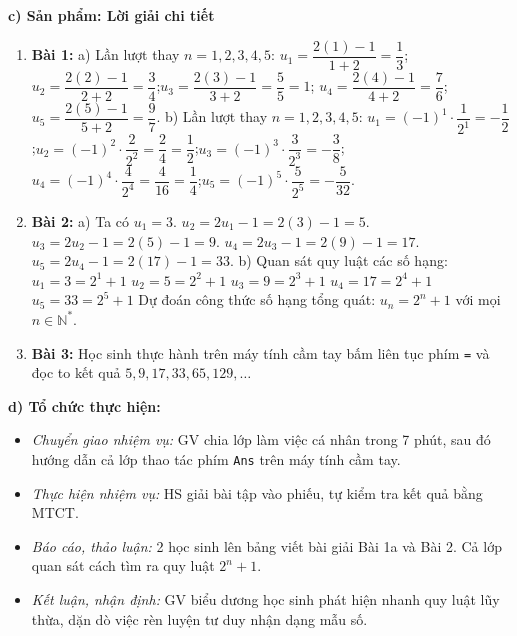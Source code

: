 \documentclass[12pt, a4paper]{article}
\begin{document}
\noindent \textbf{c) Sản phẩm: Lời giải chi tiết}  
\begin{enumerate}[leftmargin=0.6cm]  
    \item \textbf{Bài 1:}  
    a) Lần lượt thay $n = 1, 2, 3, 4, 5$:  
    $u_1 = \dfrac{2(1) - 1}{1 + 2} = \dfrac{1}{3}$;\quad $u_2 = \dfrac{2(2) - 1}{2 + 2} = \dfrac{3}{4}$;\quad $u_3 = \dfrac{2(3) - 1}{3 + 2} = \dfrac{5}{5} = 1$;  
    $u_4 = \dfrac{2(4) - 1}{4 + 2} = \dfrac{7}{6}$;\quad $u_5 = \dfrac{2(5) - 1}{5 + 2} = \dfrac{9}{7}$.  
    b) Lần lượt thay $n = 1, 2, 3, 4, 5$:  
    $u_1 = (-1)^1 \cdot \dfrac{1}{2^1} = -\dfrac{1}{2}$;\quad $u_2 = (-1)^2 \cdot \dfrac{2}{2^2} = \dfrac{2}{4} = \dfrac{1}{2}$;\quad $u_3 = (-1)^3 \cdot \dfrac{3}{2^3} = -\dfrac{3}{8}$;  
    $u_4 = (-1)^4 \cdot \dfrac{4}{2^4} = \dfrac{4}{16} = \dfrac{1}{4}$;\quad $u_5 = (-1)^5 \cdot \dfrac{5}{2^5} = -\dfrac{5}{32}$.  
  
    \item \textbf{Bài 2:}  
    a) Ta có $u_1 = 3$.  
    $u_2 = 2u_1 - 1 = 2(3) - 1 = 5$.  
    $u_3 = 2u_2 - 1 = 2(5) - 1 = 9$.  
    $u_4 = 2u_3 - 1 = 2(9) - 1 = 17$.  
    $u_5 = 2u_4 - 1 = 2(17) - 1 = 33$.  
    b) Quan sát quy luật các số hạng:  
    $u_1 = 3 = 2^1 + 1$  
    $u_2 = 5 = 2^2 + 1$  
    $u_3 = 9 = 2^3 + 1$  
    $u_4 = 17 = 2^4 + 1$  
    $u_5 = 33 = 2^5 + 1$  
    Dự đoán công thức số hạng tổng quát: $u_n = 2^n + 1$ với mọi $n \in \mathbb{N}^*$.  
    \item \textbf{Bài 3:} Học sinh thực hành trên máy tính cầm tay bấm liên tục phím \texttt{=} và đọc to kết quả $5, 9, 17, 33, 65, 129,\dots$  
\end{enumerate}  
  
\noindent \textbf{d) Tổ chức thực hiện:}  
\begin{itemize}[leftmargin=0.8cm]  
    \item \textit{Chuyển giao nhiệm vụ:} GV chia lớp làm việc cá nhân trong 7 phút, sau đó hướng dẫn cả lớp thao tác phím \texttt{Ans} trên máy tính cầm tay.  
    \item \textit{Thực hiện nhiệm vụ:} HS giải bài tập vào phiếu, tự kiểm tra kết quả bằng MTCT.  
    \item \textit{Báo cáo, thảo luận:} 2 học sinh lên bảng viết bài giải Bài 1a và Bài 2. Cả lớp quan sát cách tìm ra quy luật $2^n + 1$.  
    \item \textit{Kết luận, nhận định:} GV biểu dương học sinh phát hiện nhanh quy luật lũy thừa, dặn dò việc rèn luyện tư duy nhận dạng mẫu số.  
\end{itemize}  
  
\end{document}
